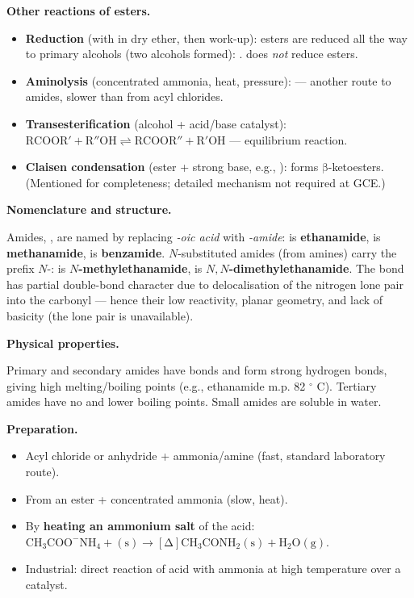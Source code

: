 \documentclass[11pt]{article}
\newcounter{popsec}
\newcounter{popsub}
\newcommand{\courssub}[1]{%
  \stepcounter{popsub}%
  \par\vspace{9pt}\noindent{\popxbold\fontsize{11.5}{13}\selectfont\color{popink}{\color{poporange}\thepopsec.\thepopsub}\hspace{6pt}#1}\par\nopagebreak\vspace{4pt}
}
\begin{document}
\textbf{Other reactions of esters.}\par
\begin{itemize}
\item \textbf{Reduction} (with  in dry ether, then  work-up): esters are reduced all the way to primary alcohols (two alcohols formed): .  does \emph{not} reduce esters.
\item \textbf{Aminolysis} (concentrated ammonia, heat, pressure):  — another route to amides, slower than from acyl chlorides.
\item \textbf{Transesterification} (alcohol + acid/base catalyst): $\mathrm{RCOOR' + R''OH \rightleftharpoons RCOOR'' + R'OH}$ — equilibrium reaction.
\item \textbf{Claisen condensation} (ester + strong base, e.g., ): forms \ensuremath{\mathrm{\beta}}-ketoesters. (Mentioned for completeness; detailed mechanism not required at GCE.)
\end{itemize}

\courssub{Amides}

\textbf{Nomenclature and structure.}\par
Amides, , are named by replacing \emph{-oic acid} with \emph{-amide}:  is \textbf{ethanamide},  is \textbf{methanamide},  is \textbf{benzamide}. $N$-substituted amides (from amines) carry the prefix $N$-:  is \textbf{$N$-methylethanamide},  is \textbf{$N,N$-dimethylethanamide}. The  bond has partial double-bond character due to delocalisation of the nitrogen lone pair into the carbonyl — hence their low reactivity, planar geometry, and lack of basicity (the lone pair is unavailable).

\textbf{Physical properties.}\par
Primary and secondary amides have  bonds and form strong hydrogen bonds, giving high melting/boiling points (e.g., ethanamide m.p. 82 \ensuremath{{}^{\circ}} C). Tertiary amides have no  and lower boiling points. Small amides are soluble in water.

\textbf{Preparation.}\par
\begin{itemize}
\item Acyl chloride or anhydride + ammonia/amine (fast, standard laboratory route).
\item From an ester + concentrated ammonia (slow, heat).
\item By \textbf{heating an ammonium salt} of the acid: \ensuremath{\mathrm{CH_{3}COO^{-}NH_{4}+(s) \rightarrow [\Delta] CH_{3}CONH_{2}(s) + H_{2}O(g)}}.
\item Industrial: direct reaction of acid with ammonia at high temperature over a catalyst.
\end{itemize}
\end{document}
